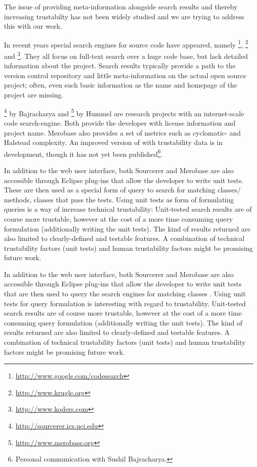 The issue of providing meta-information alongside search results and thereby increasing trustabilty has not been widely studied and we are trying to address this with our work.

In recent years special search engines for source code have appeared, namely  \textsc{\gcs}\footnote{\url{http://www.google.com/codesearch}}, \textsc{\krugle}\footnote{\url{http://www.krugle.org}} and  \textsc{\koders}\footnote{\url{http://www.koders.com}}. They all focus on full-text search over a huge code base, but lack detailed information about the project. Search results typically provide a path to the version control repository and little meta-information on the actual open source project; often, even such basic information as the name and homepage of the project are missing.

\textsc{\sourcerer}\footnote{\url{http://sourcerer.ics.uci.edu}} by Bajracharya \etal \cite{Bajr06a} and \textsc{\merobase}\footnote{\url{http://www.merobase.org}} by Hummel \etal \cite{Humm08a} are research projects with an internet-scale code search-engine. Both provide the developer with license information and project name. Merobase also provides a set of metrics such as cyclomatic- and Halstead complexity.  An improved version of \sourcerer with trustability data is in development, though it has not yet been published\footnote{Personal communication with Sushil Bajracharya.}. 

In addition to the web user interface, both Sourcerer and Merobase are also accessible through Eclipse plug-ins that allow the developer to write unit tests. These are then used as a special form of query to search for matching classes/ methods, \ie classes that pass the tests\cite{Humm08a}. Using unit tests as form of formulating queries is a way of increase technical trustability: Unit-tested search results are of course more trustable, however at the cost of a more time consuming query formulation (\ie additionally writing the unit tests). The kind of results returned are also limited to clearly-defined and testable features.  A combination of technical trustability factors (\eg unit tests) and human trustability factors might be promising future work.

In addition to the web user interface, both Sourcerer and Merobase are also accessible through Eclipse plug-ins that allow the developer to write unit tests that are then used to query the search engines for matching classes \cite{Lemo07a,Humm08a}. Using unit tests for query formulation is interesting with regard to trustability. Unit-tested search results are of course more trustable, however at the cost of a more time consuming query formulation (\ie additionally writing the unit tests).  The kind of results returned are also limited to clearly-defined and testable features.  A combination of technical trustability factors (\eg unit tests) and human trustability factors might be promising future work.

